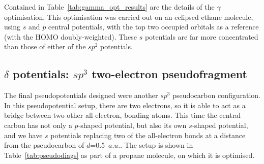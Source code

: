 \documentclass[aip,reprint,nofootinbib]{revtex4-1}
\begin{document}
Contained in Table~\ref{tab:gamma_opt_results} are the details of the $\gamma$ optimisation. This optimisation was carried out on an eclipsed ethane molecule, using $s$ and $p$ central potentials, with the top two occupied orbitals as a reference (with the HOMO doubly-weighted). These $s$ potentials are far more concentrated than those of either of the $sp^2$ potentials. 

\subsection{$\delta$ potentials: $sp^{3}$ two-electron pseudofragment}

The final pseudopotentials designed were another $sp^3$ pseudocarbon configuration. In this pseudopotential setup, there are two electrons, so it is able to act as a bridge between two other all-electron, bonding atoms. This time the central carbon has not only a $p$-shaped potential, but also its own $s$-shaped potential, and we have $s$ potentials replacing two of the all-electron bonds at a distance from the pseudocarbon of $d$=0.5~$a.u.$. The setup is shown in Table~\ref{tab:pseudodiags} as part of a propane molecule, on which it is optimised.
\end{document}
